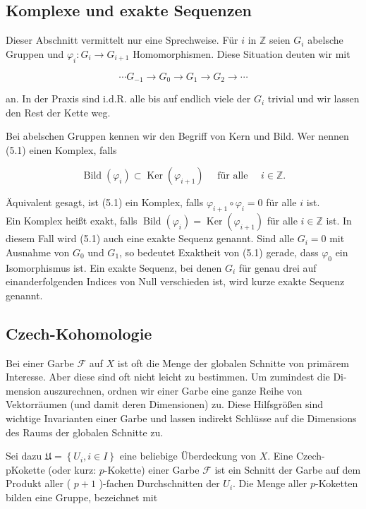 \documentclass[10pt, letterpaper]{article}
\begin{document}
\subsection {Komplexe und exakte Sequenzen}
Dieser Abschnitt vermittelt nur eine Sprechweise. Für $i$ in $\mathbb{Z}$ seien $G_{i}$ abelsche Gruppen und $\varphi_{i}: G_{i} \rightarrow G_{i+1}$ Homomorphismen. Diese Situation deuten wir mit

$$
\cdots G_{-1} \rightarrow G_{0} \rightarrow G_{1} \rightarrow G_{2} \rightarrow \cdots
$$

an. In der Praxis sind i.d.R. alle bis auf endlich viele der $G_{i}$ trivial und wir lassen den Rest der Kette weg.

Bei abelschen Gruppen kennen wir den Begriff von Kern und Bild. Wer nennen (5.1) einen Komplex, falls

$$
\operatorname{Bild}\left(\varphi_{i}\right) \subset \operatorname{Ker}\left(\varphi_{i+1}\right) \quad \text { für alle } \quad i \in \mathbb{Z} .
$$

Äquivalent gesagt, ist (5.1) ein Komplex, falls $\varphi_{i+1} \circ \varphi_{i}=0$ für alle $i$ ist.\\
Ein Komplex heißt exakt, falls $\operatorname{Bild}\left(\varphi_{i}\right)=\operatorname{Ker}\left(\varphi_{i+1}\right)$ für alle $i \in \mathbb{Z}$ ist. In diesem Fall wird (5.1) auch eine exakte Sequenz genannt. Sind alle $G_{i}=0$ mit Ausnahme von $G_{0}$ und $G_{1}$, so bedeutet Exaktheit von (5.1) gerade, dass $\varphi_{0}$ ein Isomorphismus ist. Ein exakte Sequenz, bei denen $G_{i}$ für genau drei auf einanderfolgenden Indices von Null verschieden ist, wird kurze exakte Sequenz genannt.

\subsection {Czech-Kohomologie}
Bei einer Garbe $\mathcal{F}$ auf $X$ ist oft die Menge der globalen Schnitte von primärem Interesse. Aber diese sind oft nicht leicht zu bestimmen. Um zumindest die Di-\\
mension auszurechnen, ordnen wir einer Garbe eine ganze Reihe von Vektorräumen (und damit deren Dimensionen) zu. Diese Hilfsgrößen sind wichtige Invarianten einer Garbe und lassen indirekt Schlüsse auf die Dimensions des Raums der globalen Schnitte zu.

Sei dazu $\mathfrak{U}=\left\{U_{i}, i \in I\right\}$ eine beliebige Überdeckung von $X$. Eine Czech-pKokette (oder kurz: $p$-Kokette) einer Garbe $\mathcal{F}$ ist ein Schnitt der Garbe auf dem Produkt aller ( $p+1$ )-fachen Durchschnitten der $U_{i}$. Die Menge aller $p$-Koketten bilden eine Gruppe, bezeichnet mit
\end{document}
